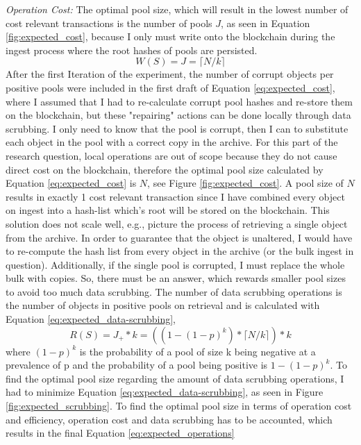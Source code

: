 \textit{Operation Cost:} The optimal pool size, which will result in the lowest number of cost relevant transactions is the number of pools $J$, as seen in Equation \ref{fig:expected_cost}, because I only must write onto the blockchain during the ingest process where the root hashes of pools are persisted.
\begin{equation}\label{eq:expected_cost}
    W(S) = J = \lceil N/k \rceil
\end{equation}
After the first Iteration of the experiment, the number of corrupt objects per positive pools were included in the first draft of Equation \ref{eq:expected_cost}, where I assumed that I had to re-calculate corrupt pool hashes and re-store them on the blockchain, but these "repairing" actions can be done locally through data scrubbing. I only need to know that the pool is corrupt, then I can to substitute each object in the pool with a correct copy in the archive. For this part of the research question, local operations are out of scope because they do not cause direct cost on the blockchain, therefore the optimal pool size calculated by Equation \ref{eq:expected_cost} is $N$, see Figure \ref{fig:expected_cost}. A pool size of $N$ results in exactly 1 cost relevant transaction since I have combined every object on ingest into a hash-list which's root will be stored on the blockchain. This solution does not scale well, e.g., picture the process of retrieving a single object from the archive. In order to guarantee that the object is unaltered, I would have to re-compute the hash list from every object in the archive (or the bulk ingest in question). Additionally, if the single pool is corrupted, I must replace the whole bulk with copies. 
So, there must be an answer, which rewards smaller pool sizes to avoid too much data scrubbing. The number of data scrubbing operations is the number of objects in positive pools on retrieval and is calculated with Equation \ref{eq:expected_data-scrubbing},
\begin{equation}\label{eq:expected_data-scrubbing}
    R(S) = J_+ * k = ((1-(1-p)^k)* \lceil N/k \rceil) * k
\end{equation}
where $(1-p)^k$ is the probability of a pool of size k being negative at a prevalence of p and the probability of a pool being positive is $1-(1-p)^k$. To find the optimal pool size regarding the amount of data scrubbing operations, I had to minimize Equation \ref{eq:expected_data-scrubbing}, as seen in Figure \ref{fig:expected_scrubbing}.
To find the optimal pool size in terms of operation cost and efficiency, operation cost and data scrubbing has to be accounted, which results in the final Equation \ref{eq:expected_operations}
